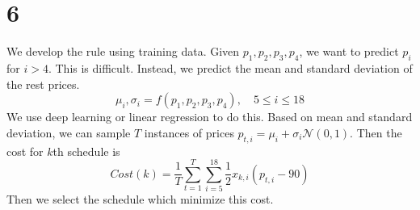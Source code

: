 \documentclass[12pt]{article}
\begin{document}
\section*{6}
 We develop the rule using training data. Given $p_1, p_2, p_3, p_4$, we want to predict $p_i$ for $i > 4$. This is difficult. Instead, we predict the mean and standard deviation of the rest prices. 
 \begin{equation}
 \mu_i, \sigma_i = f(p_1, p_2, p_3, p_4), \quad 5 \le i \le 18 \nonumber
 \end{equation}
 We use deep learning or linear regression to do this. Based on mean and standard deviation, we can sample $T$ instances of prices $p_{t, i} = \mu_i + \sigma_i \mathcal{N}(0, 1)$. Then the cost for $k$th schedule is
 \begin{equation}
 Cost(k) = \frac{1}{T} \sum_{t=1}^{T} \sum_{i=5}^{18} \frac{1}{2} x_{k, i} (p_{t, i} - 90) \nonumber
 \end{equation}
 Then we select the schedule which minimize this cost.
\end{document}
